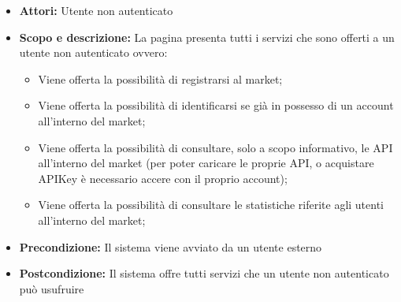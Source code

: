 \documentclass[12pt,a4paper,titlepage]{article}
\begin{document}
\begin{itemize}
	\item \textbf{Attori:} Utente non autenticato
	\item \textbf{Scopo e descrizione:} La pagina presenta tutti i servizi che sono offerti a un utente non autenticato ovvero:
	\begin{itemize} 
		\item Viene offerta la possibilità di registrarsi al market; 
		\item Viene offerta la possibilità di identificarsi se già in possesso di un account all'interno del market;
		\item Viene offerta la possibilità di consultare, solo a scopo informativo, le API all'interno del market (per poter caricare le proprie API, o acquistare APIKey è necessario accere con il proprio account); 
		\item Viene offerta la possibilità di consultare le statistiche riferite agli utenti all'interno del market;
	\end{itemize}
	\item \textbf{Precondizione:} Il sistema viene avviato da un utente esterno
	\item \textbf{Postcondizione:} Il sistema offre tutti servizi che un utente non autenticato può usufruire
\end{itemize}
\end{document}
